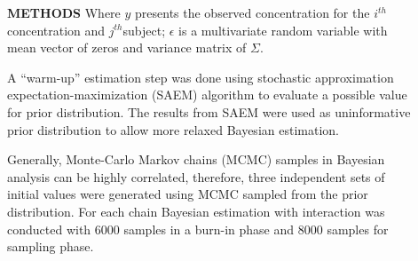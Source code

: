 \documentclass[final]{beamer}
\newlength{\sepwidth}
\newlength{\colwidth}
\newcommand{\separatorcolumn}{\begin{column}{\sepwidth}\end{column}}
\begin{document}
\begin{frame}[t]
\begin{columns}[t]
\begin{column}{\colwidth}
\begin{block}{\textbf{METHODS}}
Where $y$ presents the observed concentration for the $i^{th}$ concentration and $j^{th}$subject; $\epsilon$ is a multivariate random variable  with mean vector of zeros and variance matrix of $\Sigma$.\par 
A “warm-up” estimation step was done using stochastic approximation expectation-maximization (SAEM) algorithm to evaluate a possible value for prior distribution. The results from SAEM were used as uninformative prior distribution to allow more relaxed Bayesian estimation.\par
Generally, Monte-Carlo Markov chains (MCMC) samples in Bayesian analysis
can be highly correlated, therefore, three independent sets of initial values were
generated using MCMC sampled from the prior distribution. For each chain
Bayesian estimation with interaction was conducted with 6000 samples in a
burn-in phase and 8000 samples for sampling phase.
\end{block}
\end{column}
\separatorcolumn
\begin{column}{\colwidth}

\end{column}
\end{columns} 
\end{frame}
\end{document}
